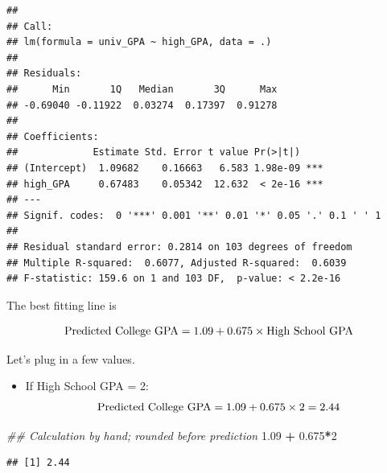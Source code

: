 \documentclass[]{book}
\newenvironment{Shaded}{\begin{snugshade}}{\end{snugshade}}
\newcommand{\CommentTok}[1]{\textcolor[rgb]{0.56,0.35,0.01}{\textit{#1}}}
\newcommand{\DataTypeTok}[1]{\textcolor[rgb]{0.13,0.29,0.53}{#1}}
\newcommand{\DecValTok}[1]{\textcolor[rgb]{0.00,0.00,0.81}{#1}}
\newcommand{\FloatTok}[1]{\textcolor[rgb]{0.00,0.00,0.81}{#1}}
\newcommand{\KeywordTok}[1]{\textcolor[rgb]{0.13,0.29,0.53}{\textbf{#1}}}
\newcommand{\NormalTok}[1]{#1}
\newcommand{\OperatorTok}[1]{\textcolor[rgb]{0.81,0.36,0.00}{\textbf{#1}}}
\newcommand{\StringTok}[1]{\textcolor[rgb]{0.31,0.60,0.02}{#1}}
\providecommand{\tightlist}{%
  \setlength{\itemsep}{0pt}\setlength{\parskip}{0pt}}
\begin{document}
\begin{verbatim}
## 
## Call:
## lm(formula = univ_GPA ~ high_GPA, data = .)
## 
## Residuals:
##      Min       1Q   Median       3Q      Max 
## -0.69040 -0.11922  0.03274  0.17397  0.91278 
## 
## Coefficients:
##             Estimate Std. Error t value Pr(>|t|)    
## (Intercept)  1.09682    0.16663   6.583 1.98e-09 ***
## high_GPA     0.67483    0.05342  12.632  < 2e-16 ***
## ---
## Signif. codes:  0 '***' 0.001 '**' 0.01 '*' 0.05 '.' 0.1 ' ' 1
## 
## Residual standard error: 0.2814 on 103 degrees of freedom
## Multiple R-squared:  0.6077, Adjusted R-squared:  0.6039 
## F-statistic: 159.6 on 1 and 103 DF,  p-value: < 2.2e-16
\end{verbatim}

The best fitting line is

\[ \hbox{Predicted College GPA} = 1.09 + 0.675 \times \hbox{High School GPA} \]

Let's plug in a few values.

\begin{itemize}
\tightlist
\item
  If High School GPA = 2:\\
  \[ \hbox{Predicted College GPA} = 1.09 + 0.675 \times 2 = 2.44 \]
\end{itemize}

\begin{Shaded}
\begin{Highlighting}[]
\CommentTok{## Calculation by hand; rounded before prediction}
\FloatTok{1.09} \OperatorTok{+}\StringTok{ }\FloatTok{0.675}\OperatorTok{*}\DecValTok{2}
\end{Highlighting}
\end{Shaded}

\begin{verbatim}
## [1] 2.44
\end{verbatim}

\begin{Shaded}
\end{Shaded}
\end{document}
